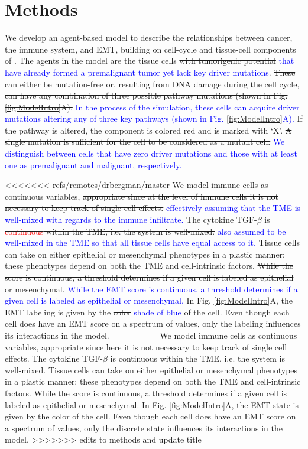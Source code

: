 \documentclass[11pt]{article}
\newcommand{\tcr} { \textcolor{red} }
\newcommand{\tcb} { \textcolor{blue} }
\begin{document}
\section{Methods}
We develop an agent-based model to describe the relationships between cancer, the immune system, and EMT, building on cell-cycle and tissue-cell components of \cite{guo17_multiscale}. 
The agents in the model are the tissue cells \sout{with tumorigenic potential} \tcb{that have already formed a premalignant tumor yet lack key driver mutations}.
\sout{These can either be mutation-free or, resulting from DNA damage during the cell cycle, can have any combination of three possible pathway mutations (shown in Fig. \ref{fig:ModelIntro}A).}
\tcb{
In the process of the simulation, these cells can acquire driver mutations altering any of three key pathways (shown in Fig. \ref{fig:ModelIntro}A).
}
If the pathway is altered, the component is colored red and is marked with `X'.
\sout{A single mutation is sufficient for the cell to be considered as a mutant cell.}
\tcb{
We distinguish between cells that have zero driver mutations and those with at least one as premalignant and malignant, respectively.
}
\par
<<<<<<< refs/remotes/drbergman/master
We model immune cells as continuous variables, \sout{appropriate since at the level of immune cells it is not necessary to keep track of single cell effects.}
\tcb{
effectively assuming that the TME is well-mixed with regards to the immune infiltrate.
}
The cytokine TGF-$\beta$ is \sout{\tcr{continuous} within the TME, i.e. the system is well-mixed.}
\tcb{
also assumed to be well-mixed in the TME so that all tissue cells have equal access to it.
}
Tissue cells can take on either epithelial or mesenchymal phenotypes in a plastic manner: these phenotypes depend on both the TME and cell-intrinsic factors.
\sout{While the score is continuous, a threshold determines if a given cell is labeled as epithelial or mesenchymal.}
\tcb{While the EMT score is continuous, a threshold determines if a given cell is labeled as epithelial or mesenchymal.}
In Fig. \ref{fig:ModelIntro}A, the EMT labeling is given by the \sout{color} \tcb{shade of blue} of the cell.
Even though each cell does have an EMT score on a spectrum of values, only the labeling influences its interactions in the model.
=======
We model immune cells as continuous variables, appropriate since here it is not necessary to keep track of single cell effects.
The cytokine TGF-$\beta$ is continuous within the TME, i.e. the system is well-mixed.
Tissue cells can take on either epithelial or mesenchymal phenotypes in a plastic manner: these phenotypes depend on both the TME and cell-intrinsic factors.
While the score is continuous, a threshold determines if a given cell is labeled as epithelial or mesenchymal.
In Fig. \ref{fig:ModelIntro}A, the EMT state is given by the color of the cell.
Even though each cell does have an EMT score on a spectrum of values, only the discrete state influences its interactions in the model.
>>>>>>> edits to methods and update title
\end{document}
